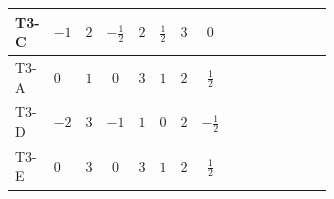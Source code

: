 \documentclass[8pt]{article}
\begin{document}
\begin{landscape}
\begin{longtable}{@{}llcccccc >{\raggedright\arraybackslash}p{0.21\linewidth} >{\raggedright\arraybackslash}p{0.21\linewidth} >{\raggedright\arraybackslash}p{0.21\linewidth}@{}}
\midrule
T3-C & $-1$ & $2$ & $-\frac{1}{2}$ & $2$ & $\frac{1}{2}$ & $3$ & $0$ & \scriptsize\adjustbox{max width=\linewidth}{$\begin{gathered} +2 {\lambda_{12}} {\lambda_{T3}}\end{gathered}$} & \scriptsize\adjustbox{max width=\linewidth}{$\begin{gathered} +2 {\lambda_H} {\lambda_{T3}}\end{gathered}$} & \scriptsize\adjustbox{max width=\linewidth}{$\begin{gathered} +4 {\lambda_{H1}} {\lambda_{T3}}\end{gathered}$} \\
\midrule
T3-A & $0$ & $1$ & $0$ & $3$ & $1$ & $2$ & $\frac{1}{2}$ & \scriptsize\adjustbox{max width=\linewidth}{$\begin{gathered} +2 {\lambda_{12}} {\lambda_{T3}}\end{gathered}$} & \scriptsize\adjustbox{max width=\linewidth}{$\begin{gathered} +2 {\lambda_H} {\lambda_{T3}}\end{gathered}$} & \scriptsize\adjustbox{max width=\linewidth}{$\begin{gathered} +4 {\lambda_{H1}} {\lambda_{T3}}\end{gathered}$} \\
\midrule
T3-D & $-2$ & $3$ & $-1$ & $1$ & $0$ & $2$ & $-\frac{1}{2}$ & \scriptsize\adjustbox{max width=\linewidth}{$\begin{gathered} +2 {\lambda_{12}} {\lambda_{T3}}\end{gathered}$} & \scriptsize\adjustbox{max width=\linewidth}{$\begin{gathered} +2 {\lambda_H} {\lambda_{T3}}\end{gathered}$} & \scriptsize\adjustbox{max width=\linewidth}{$\begin{gathered} +4 {\lambda_{H1}} {\lambda_{T3}}\end{gathered}$} \\
\midrule
T3-E & $0$ & $3$ & $0$ & $3$ & $1$ & $2$ & $\frac{1}{2}$ & \scriptsize\adjustbox{max width=\linewidth}{$\begin{gathered} +2 {\lambda_{12}} {\lambda_{T3}}\end{gathered}$} & \scriptsize\adjustbox{max width=\linewidth}{$\begin{gathered} +2 {\lambda_H} {\lambda_{T3}}\end{gathered}$} & \scriptsize\adjustbox{max width=\linewidth}{$\begin{gathered} +4 {\lambda_{H1}} {\lambda_{T3}}\end{gathered}$} \\
\midrule
\bottomrule
\end{longtable}
\clearpage

\end{landscape}
\end{document}
